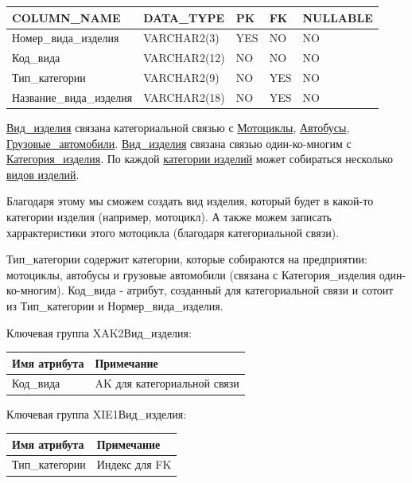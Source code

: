 \begin{enumerate}
    \begin{tabular}{|p{7cm}|p{3cm}|p{1cm}|p{1cm}|p{3cm}|} \hline

        {\bf COLUMN\_NAME} & {\bf DATA\_TYPE} & {\bf PK} & {\bf FK} & {\bf NULLABLE} \\ \hline
        Номер\_вида\_изделия & VARCHAR2(3) & YES & NO & NO \\ \hline
        Код\_вида & VARCHAR2(12) & NO & NO & NO \\ \hline
        Тип\_категории & VARCHAR2(9) & NO & YES & NO \\ \hline
        Название\_вида\_изделия & VARCHAR2(18) & NO & YES & NO \\ \hline

    \end{tabular}

    \underline{Вид\_изделия} связана категориальной связью с \underline{Мотоциклы}, \underline{Автобусы}, \underline{Грузовые\_автомобили}.
    \underline{Вид\_изделия} связана связью один-ко-многим с \underline{Категория\_изделия}.
    По каждой \underline{категории изделий} может собираться несколько \underline{видов изделий}.

    Благодаря этому мы сможем создать вид изделия, который будет в какой-то категории изделия (например, мотоцикл).
    А также можем записать харрактеристики этого мотоцикла (благодаря категориальной связи).

    Тип\_категории содержит категории, которые собираются на предприятии: мотоциклы, автобусы и грузовые автомобили (связана с Категория\_изделия один-ко-многим).
    Код\_вида - атрибут, созданный для категориальной связи и сотоит из Тип\_категории и Нормер\_вида\_изделия.

    Ключевая группа XAK2Вид\_изделия:

    \begin{tabular}{|p{7cm}|p{9.3cm}|} \hline

        {\bf Имя атрибута} & {\bf Примечание} \\ \hline
        Код\_вида & AK для категориальной связи \\ \hline

    \end{tabular}

    Ключевая группа XIE1Вид\_изделия:

    \begin{tabular}{|p{7cm}|p{9.3cm}|} \hline

        {\bf Имя атрибута} & {\bf Примечание} \\ \hline
        Тип\_категории & Индекс для FK \\ \hline


\end{tabular}
\end{enumerate}
